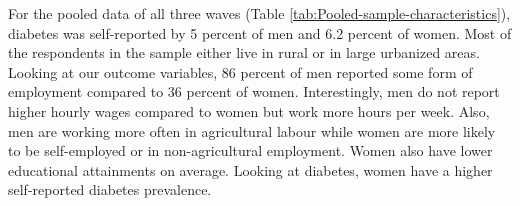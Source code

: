 \documentclass[12pt,english,british]{article}
\begin{document}
For the pooled data of all three waves (Table \ref{tab:Pooled-sample-characteristics}),
diabetes was self-reported by 5 percent of men and 6.2 percent of
women. Most of the respondents in the sample either live in rural
or in large urbanized areas. Looking at our outcome variables, 86
percent of men reported some form of employment compared to 36 percent
of women. Interestingly, men do not report higher hourly wages compared
to women but work more hours per week. Also, men are working more
often in agricultural labour while women are more likely to be self-employed
or in non-agricultural employment. Women also have lower educational
attainments on average. Looking at diabetes, women have a higher self-reported
diabetes prevalence. 
\begin{table}[h]
\begin{center}
\begin{adjustbox}{max width=\textwidth}


\end{adjustbox}
\end{center}
\end{table}
\end{document}
